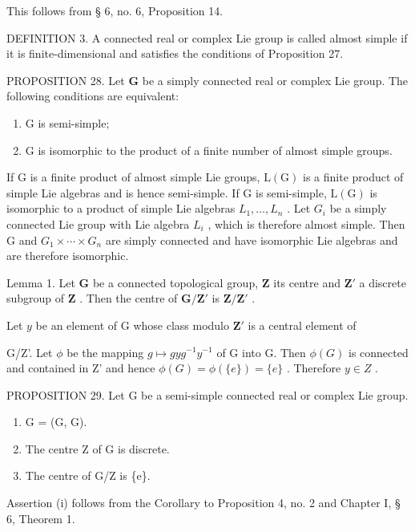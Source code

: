This follows from § 6, no. 6, Proposition 14.

DEFINITION 3. A connected real or complex Lie group is called almost simple if it is finite-dimensional and satisfies the conditions of Proposition 27.

PROPOSITION 28. Let \(\mathbf{G}\) be a simply connected real or complex Lie group. The following conditions are equivalent:

\begin{enumerate}
\def\labelenumi{(\roman{enumi})}
\item
  G is semi-simple;
\item
  G is isomorphic to the product of a finite number of almost simple groups.
\end{enumerate}

If G is a finite product of almost simple Lie groups, \(\mathrm{L}(\mathrm{G})\) is a finite product of simple Lie algebras and is hence semi-simple. If G is semi-simple, \(\mathrm{L}(\mathrm{G})\) is isomorphic to a product of simple Lie algebras \(L_{1},\ldots,L_{n}\) . Let \(G_{i}\) be a simply connected Lie group with Lie algebra \(L_{i}\) , which is therefore almost simple. Then G and \(G_{1}\times\cdots\times G_{n}\) are simply connected and have isomorphic Lie algebras and are therefore isomorphic.

Lemma 1. Let \(\mathbf{G}\) be a connected topological group, \(\mathbf{Z}\) its centre and \(\mathbf{Z}'\) a discrete subgroup of \(\mathbf{Z}\) . Then the centre of \(\mathbf{G}/\mathbf{Z}'\) is \(\mathbf{Z}/\mathbf{Z}'\) .

Let \(y\) be an element of G whose class modulo \(\mathbf{Z}'\) is a central element of

G/Z'. Let \(\phi\) be the mapping \(g \mapsto gyg^{-1}y^{-1}\) of G into G. Then \(\phi(G)\) is connected and contained in Z' and hence \(\phi(G) = \phi(\{e\}) = \{e\}\) . Therefore \(y \in Z\) .

PROPOSITION 29. Let G be a semi-simple connected real or complex Lie group.

\begin{enumerate}
\def\labelenumi{(\roman{enumi})}
\item
  G = (G, G).
\item
  The centre Z of G is discrete.
\item
  The centre of G/Z is \{e\}.
\end{enumerate}

Assertion (i) follows from the Corollary to Proposition 4, no. 2 and Chapter I, § 6, Theorem 1.

